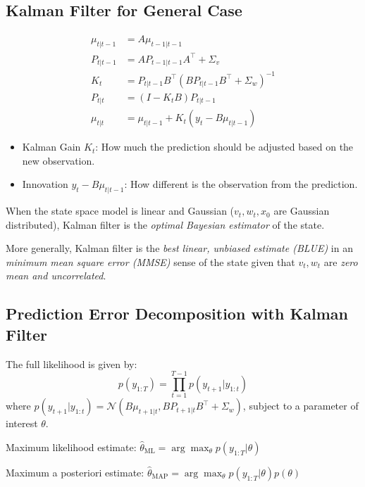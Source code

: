 \documentclass[12pt]{article}
\begin{document}
\subsection*{Kalman Filter for General Case}
\begin{align*}
\mu_{t | t-1} &= A \mu_{t-1 | t-1} \\
P_{t|t-1} &= A P_{t-1|t-1} A^\top + \Sigma_v \\
K_t &= P_{t|t-1} B^\top (B P_{t|t-1} B^\top + \Sigma_w)^{-1} \\
P_{t|t} &= (I - K_t B) P_{t | t-1} \\
\mu_{t|t} &= \mu_{t | t-1} + K_t (y_t - B \mu_{t | t-1})
\end{align*}
\begin{itemize}
    \item Kalman Gain $K_t$: How much the prediction should be adjusted based on the new observation.
    \item Innovation $y_t - B \mu_{t | t-1}$: How different is the observation from the prediction.
\end{itemize}
When the state space model is linear and Gaussian ($v_t, w_t, x_0$ are Gaussian distributed), Kalman filter is the \textit{optimal Bayesian estimator} of the state.

More generally, Kalman filter is the \textit{best linear, unbiased estimate (BLUE)} in an \textit{minimum mean square error (MMSE)} sense of the state given that $v_t, w_t$ are \textit{zero mean and uncorrelated}.

\subsection*{Prediction Error Decomposition with Kalman Filter}
The full likelihood is given by: 
$$
p(y_{1:T}) = \prod_{t=1}^{T-1} p(y_{t+1} | y_{1:t})
$$
where $p(y_{t+1} | y_{1:t}) = \mathcal{N}(B \mu_{t+1|t}, B P_{t+1|t} B^\top + \Sigma_w)$, subject to a parameter of interest $\theta$.

Maximum likelihood estimate: $\hat{\theta}_{\text{ML}} = \arg\max_\theta p(y_{1:T} | \theta)$

Maximum a posteriori estimate: $\hat{\theta}_{\text{MAP}} = \arg\max_\theta p(y_{1:T} | \theta) p(\theta)$
\end{document}
